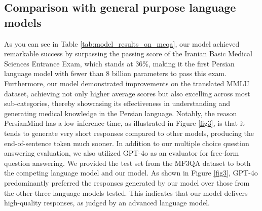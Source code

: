 \documentclass[conference]{IEEEtran}
\begin{document}
	\subsection{Comparison with general purpose language models}
	As you can see in Table \ref{tab:model_results_on_mcqa}, our model achieved remarkable success by surpassing the passing score of the Iranian Basic Medical Sciences Entrance Exam, which stands at 36\%, making it the first Persian language model with fewer than 8 billion parameters to pass this exam. Furthermore, our model demonstrated improvements on the translated MMLU dataset, achieving not only higher average scores but also excelling across most sub-categories, thereby showcasing its effectiveness in understanding and generating medical knowledge in the Persian language. Notably, the reason PersianMind has a low inference time, as illustrated in Figure \ref{fig3}, is that it tends to generate very short responses compared to other models, producing the end-of-sentence token much sooner. In addition to our multiple choice question answering evaluation, we also utilized GPT-4o \cite{b31} as an evaluator for free-form question answering. We provided the test set from the MF3QA dataset to both the competing language model and our model. As shown in Figure \ref{fig3}, GPT-4o predominantly preferred the responses generated by our model over those from the other three language models tested. This indicates that our model delivers high-quality responses, as judged by an advanced language model.
\end{document}

